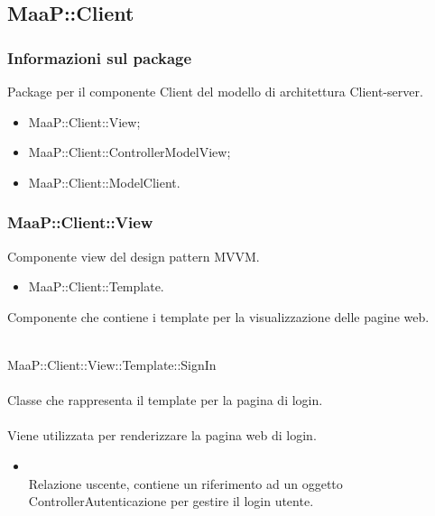 \subsection{MaaP::Client}
\subsubsection{Informazioni sul package}
Package per il componente Client del modello di architettura Client-server.
\begin{itemize}
\item MaaP::Client::View;
\item MaaP::Client::ControllerModelView;
\item MaaP::Client::ModelClient.
\end{itemize}

\subsubsection{MaaP::Client::View}
Componente view del design pattern MVVM.
\begin{itemize}
\item MaaP::Client::Template.
\end{itemize}

Componente che contiene i template per la visualizzazione delle pagine web.

	\\
	MaaP::Client::View::Template::SignIn\\
	\\
	Classe che rappresenta il template per la pagina di login.\\
	\\
	Viene utilizzata per renderizzare la pagina web di login.\\
	\begin{itemize}
	\item{}\\
	Relazione uscente, contiene un riferimento ad un oggetto ControllerAutenticazione per gestire il login utente.
	\end{itemize}
	
